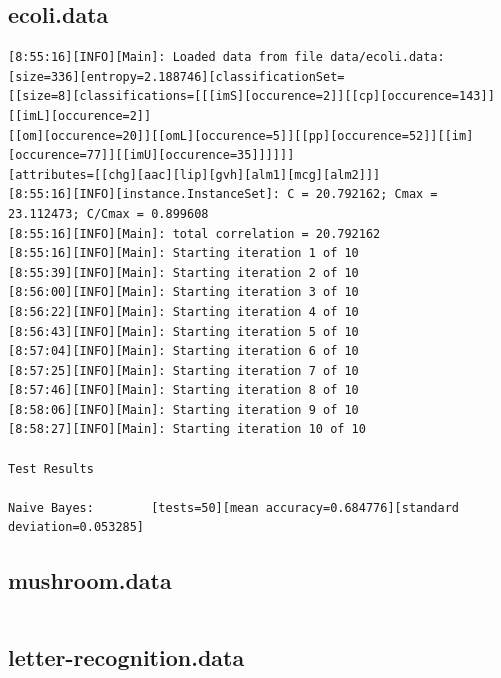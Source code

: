 \documentclass[10pt]{report}
\begin{document}
\subsection*{ecoli.data}
{\small
\begin{verbatim}
[8:55:16][INFO][Main]: Loaded data from file data/ecoli.data:
[size=336][entropy=2.188746][classificationSet=
[[size=8][classifications=[[[imS][occurence=2]][[cp][occurence=143]][[imL][occurence=2]]
[[om][occurence=20]][[omL][occurence=5]][[pp][occurence=52]][[im][occurence=77]][[imU][occurence=35]]]]]]
[attributes=[[chg][aac][lip][gvh][alm1][mcg][alm2]]] 
[8:55:16][INFO][instance.InstanceSet]: C = 20.792162; Cmax = 23.112473; C/Cmax = 0.899608 
[8:55:16][INFO][Main]: total correlation = 20.792162 
[8:55:16][INFO][Main]: Starting iteration 1 of 10 
[8:55:39][INFO][Main]: Starting iteration 2 of 10 
[8:56:00][INFO][Main]: Starting iteration 3 of 10 
[8:56:22][INFO][Main]: Starting iteration 4 of 10 
[8:56:43][INFO][Main]: Starting iteration 5 of 10 
[8:57:04][INFO][Main]: Starting iteration 6 of 10 
[8:57:25][INFO][Main]: Starting iteration 7 of 10 
[8:57:46][INFO][Main]: Starting iteration 8 of 10 
[8:58:06][INFO][Main]: Starting iteration 9 of 10 
[8:58:27][INFO][Main]: Starting iteration 10 of 10 

Test Results

Naive Bayes:		[tests=50][mean accuracy=0.684776][standard deviation=0.053285] 
\end{verbatim}
}


\subsection*{mushroom.data}
{\small
\begin{verbatim}

\end{verbatim}
}


\subsection*{letter-recognition.data}
{\small
\begin{verbatim}

\end{verbatim}
}
\end{document}
